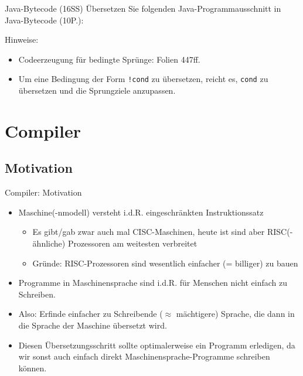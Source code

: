 \documentclass{beamer}
\begin{document}
\begin{frame}{Java-Bytecode (16SS)}
	\footnotesize
	Übersetzen Sie folgenden Java-Programmausschnitt in Java-Bytecode (10P.):


	\pause
	Hinweise:

	\begin{itemize}
		\item Codeerzeugung für bedingte Sprünge: Folien 447ff.
		\item Um eine Bedingung der Form \texttt{!cond} zu übersetzen, reicht es, \texttt{cond} zu übersetzen und die Sprungziele anzupassen.
	\end{itemize}
\end{frame}


\section{Compiler}

\subsection{Motivation}

\begin{frame}{Compiler: Motivation}
	\begin{itemize}
		\item Maschine(-nmodell) versteht i.d.R. eingeschränkten Instruktionssatz
		\begin{itemize}
			\item Es gibt/gab zwar auch mal CISC-Maschinen, heute ist sind aber RISC(-ähnliche) Prozessoren am weitesten verbreitet
			\item Gründe: RISC-Prozessoren sind wesentlich einfacher (= billiger) zu bauen
		\end{itemize}
		\item Programme in Maschinensprache sind i.d.R. für Menschen nicht einfach zu Schreiben.
		\pause
		\item Also: Erfinde einfacher zu Schreibende ($\approx$ mächtigere) Sprache, die dann in die Sprache der Maschine übersetzt wird.
		\item Diesen Übersetzungsschritt sollte optimalerweise ein Programm erledigen, da wir sonst auch einfach direkt Maschinensprache-Programme schreiben können.
	\end{itemize}
\end{frame}
\end{document}
